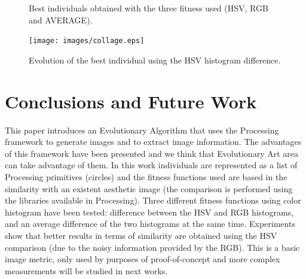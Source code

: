 \documentclass[conference]{IEEEtran}
\begin{document}
\begin{figure}[ht]
{ }
\caption{Best individuals obtained with the three fitness used (HSV, RGB and AVERAGE).}
\label{fig:bestinds}
\end{figure}

\begin{figure}
   \texttt{[image: images/collage.eps]}
\caption{Evolution of the best individual using the HSV histogram difference. }
\label{fig:collage}
\end{figure}

\section{Conclusions and Future Work}
\label{sec:conclusions}
This paper introduces an Evolutionary Algorithm that uses the Processing framework to generate images and to extract image information. The advantages of this framework have been presented and we think that Evolutionary Art area can take advantage of them. In this work individuals are represented as a list of Processing primitives (circles) and the fitness functions used are based in the similarity with an existent aesthetic image (the comparison is performed using the libraries available in Processing). Three different fitness functions using color histogram have been tested: difference between the HSV and RGB histograms, and an average difference of the two histograms at the same time. Experiments show that better results in terms of similarity are obtained using the HSV comparison (due to the noisy information provided by the RGB). This is a basic image metric, only used by purposes of proof-of-concept and more complex measurements will be studied in next works.
\end{document}
